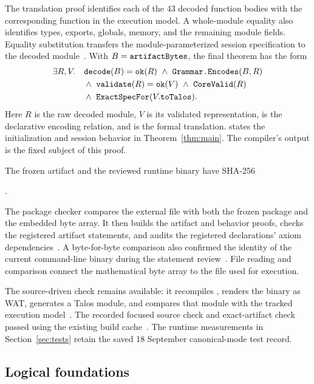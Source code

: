 The translation proof identifies each of the 43 decoded function bodies with the corresponding function in the execution model.  A whole-module equality also identifies types, exports, globals, memory, and the remaining module fields.  Equality substitution transfers the module-parameterized session specification  to the decoded module~\cite{artifact,session}.  With $B=\texttt{artifactBytes}$, the final theorem has the form
\[
\begin{aligned}
\exists R,V.\quad
 &\code{decode}(B)=\code{ok}(R)\ \land\ \code{Grammar.Encodes}(B,R)\\
 &\land\ \code{validate}(R)=\code{ok}(V)\ \land\ \code{CoreValid}(R)\\
 &\land\ \code{ExactSpecFor}(V.\code{toTalos}).
\end{aligned}
\]
Here $R$ is the raw decoded module, $V$ is its validated representation,  is the declarative encoding relation, and  is the formal translation.   states the initialization and session behavior in Theorem~\ref{thm:main}.  The compiler's output is the fixed subject of this proof.

The frozen artifact and the reviewed runtime binary have SHA-256
\begin{center}\small
{}.
\end{center}
The package checker compares the external file with both the frozen package and the embedded byte array.  It then builds the artifact and behavior proofs, checks the registered artifact statements, and audits the registered declarations' axiom dependencies~\cite{artifactgate}.  A byte-for-byte comparison also confirmed the identity of the current command-line binary during the statement review~\cite{review}.  File reading and comparison connect the mathematical byte array to the file used for execution.

The source-driven check remains available: it recompiles , renders the binary as WAT, generates a Talos module, and compares that module with the tracked execution model~\cite{gate}.  The recorded focused source check and exact-artifact check passed using the existing build cache~\cite{review}.  The runtime measurements in Section~\ref{sec:tests} retain the saved 18 September canonical-mode test record.

\subsection{Logical foundations}

